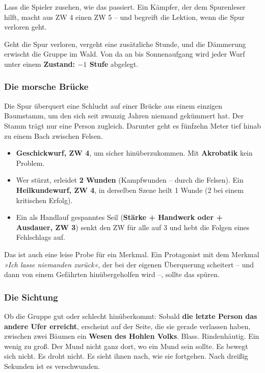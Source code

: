 \documentclass[10pt,a4paper]{article}
\newcommand{\tightlist}{\setlength{\itemsep}{0pt}\setlength{\parskip}{0pt}}
\begin{document}
Lass die Spieler zusehen, wie das passiert. Ein Kämpfer, der dem Spurenleser hilft, macht aus ZW 4 einen ZW 5 -- und begreift die Lektion, wenn die Spur verloren geht.

Geht die Spur verloren, vergeht eine zusätzliche Stunde, und die Dämmerung erwischt die Gruppe im Wald. Von da an bis Sonnenaufgang wird jeder Wurf unter einem \textbf{Zustand: $-1$ Stufe} abgelegt.

\subsubsection{Die morsche Brücke}\label{die-morsche-bruxfccke}

Die Spur überquert eine Schlucht auf einer Brücke aus einem einzigen Baumstamm, um den sich seit zwanzig Jahren niemand gekümmert hat. Der Stamm trägt nur eine Person zugleich. Darunter geht es fünfzehn Meter tief hinab zu einem Bach zwischen Felsen.

\begin{itemize}
\tightlist
\item
  \textbf{Geschickwurf, ZW 4}, um sicher hinüberzukommen. Mit \textbf{Akrobatik} kein Problem.
\item
  Wer stürzt, erleidet \textbf{2 Wunden} (Kampfwunden -- durch die Felsen). Ein \textbf{Heilkundewurf, ZW 4}, in derselben Szene heilt 1 Wunde (2 bei einem kritischen Erfolg).
\item
  Ein als Handlauf gespanntes Seil (\textbf{Stärke + Handwerk oder + Ausdauer, ZW 3}) senkt den ZW für alle auf 3 und hebt die Folgen eines Fehlschlags auf.
\end{itemize}

Das ist auch eine leise Probe für ein Merkmal. Ein Protagonist mit dem Merkmal \emph{»Ich lasse niemanden zurück«}, der bei der eigenen Überquerung scheitert -- und dann von einem Gefährten hinübergeholfen wird --, sollte das spüren.

\subsubsection{Die Sichtung}\label{die-sichtung}

Ob die Gruppe gut oder schlecht hinüberkommt: Sobald \textbf{die letzte Person das andere Ufer erreicht}, erscheint auf der Seite, die sie gerade verlassen haben, zwischen zwei Bäumen ein \textbf{Wesen des Hohlen Volks}. Blass. Rindenhäutig. Ein wenig zu groß. Der Mund nicht ganz dort, wo ein Mund sein sollte. Es bewegt sich nicht. Es droht nicht. Es sieht ihnen nach, wie sie fortgehen. Nach dreißig Sekunden ist es verschwunden.
\end{document}
